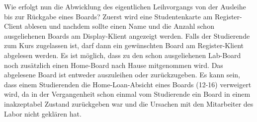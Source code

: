Wie erfolgt nun die Abwicklung des eigentlichen Leihvorgangs von der Ausleihe bis zur Rückgabe eines Boards?  Zuerst wird eine Studentenkarte am Register-Client ablesen und nachdem sollte einen Name und die Anzahl schon ausgeliehenen Boards am Display-Klient angezeigt werden. Falls der Studierende zum Kurs zugelassen ist, darf dann ein gewünschten Board am Register-Klient abgelesen werden. Es ist möglich, dass zu den schon ausgeliehenen Lab-Board noch zusätzlich einen Home-Board nach Hause mitgenommen wird. Das abgelesene Board ist entweder auszuleihen oder zurückzugeben. Es kann sein, dass einem Studierenden die Home-Loan-Absicht eines Boards (12-16) verweigert wird, da in der Vergangenheit schon einmal vom Studierende ein Board in einem inakzeptabel Zustand zurückgeben war und die Ursachen mit den Mitarbeiter des Labor nicht geklären hat.\\\
 
 